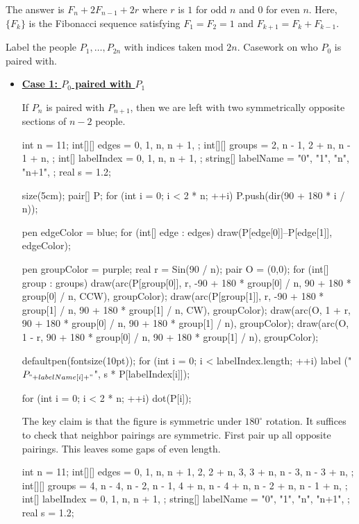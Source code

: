 The answer is $\boxed{F_n+2F_{n-1}+2r}$ where $r$ is $1$ for odd $n$ and $0$ for even $n$. Here, $\{F_k\}$ is the Fibonacci sequence satisfying $F_1=F_2=1$ and $F_{k+1}=F_k+F_{k-1}$.

Label the people $P_1,\ldots,P_{2n}$ with indices taken mod $2n$. Casework on who $P_0$ is paired with.
\begin{itemize}
	\item \underline{\textbf{Case 1: $P_0$ paired with $P_1$}}
	
	If $P_n$ is paired with $P_{n+1}$, then we are left with two symmetrically opposite sections of $n-2$ people.
	\begin{center}
		\begin{asy}
			int n = 11;
			int[][] edges = {
				{0, 1},
				{n, n + 1},
			};
			int[][] groups = {
				{2, n - 1},
				{2 + n, n - 1 + n},
			};
			int[] labelIndex = {
				0,
				1,
				n,
				n + 1,
			};
			string[] labelName = {
				"0",
				"1",
				"n",
				"n+1",
			};
			real s = 1.2;
			
			size(5cm);
			pair[] P;
			for (int i = 0; i < 2 * n; ++i) P.push(dir(90 + 180 * i / n));
			
			pen edgeColor = blue;
			for (int[] edge : edges) draw(P[edge[0]]--P[edge[1]], edgeColor);
			
			pen groupColor = purple;
			real r = Sin(90 / n);
			pair O = (0,0);
			for (int[] group : groups) {
				draw(arc(P[group[0]], r, -90 + 180 * group[0] / n, 90 + 180 * group[0] / n, CCW), groupColor);
				draw(arc(P[group[1]], r, -90 + 180 * group[1] / n, 90 + 180 * group[1] / n, CW), groupColor);
				draw(arc(O, 1 + r, 90 + 180 * group[0] / n, 90 + 180 * group[1] / n), groupColor);
				draw(arc(O, 1 - r, 90 + 180 * group[0] / n, 90 + 180 * group[1] / n), groupColor);
			}
			
			defaultpen(fontsize(10pt));
			for (int i = 0; i < labelIndex.length; ++i) label ("$P_{" + labelName[i] + "}$", s * P[labelIndex[i]]);
			
			for (int i = 0; i < 2 * n; ++i) dot(P[i]);
		\end{asy}
	\end{center}
	The key claim is that the figure is symmetric under $180^\circ$ rotation. It suffices to check that neighbor pairings are symmetric. First pair up all opposite pairings. This leaves some gaps of even length.
	\begin{center}
		\begin{asy}
			int n = 11;
			int[][] edges = {
				{0, 1},
				{n, n + 1},
				{2, 2 + n},
				{3, 3 + n},
				{n - 3, n - 3 + n},
			};
			int[][] groups = {
				{4, n - 4},
				{n - 2, n - 1},
				{4 + n, n - 4 + n},
				{n - 2 + n, n - 1 + n},
			};
			int[] labelIndex = {
				0,
				1,
				n,
				n + 1,
			};
			string[] labelName = {
				"0",
				"1",
				"n",
				"n+1",
			};
			real s = 1.2;
			

\end{asy}
\end{center}
\end{itemize}
